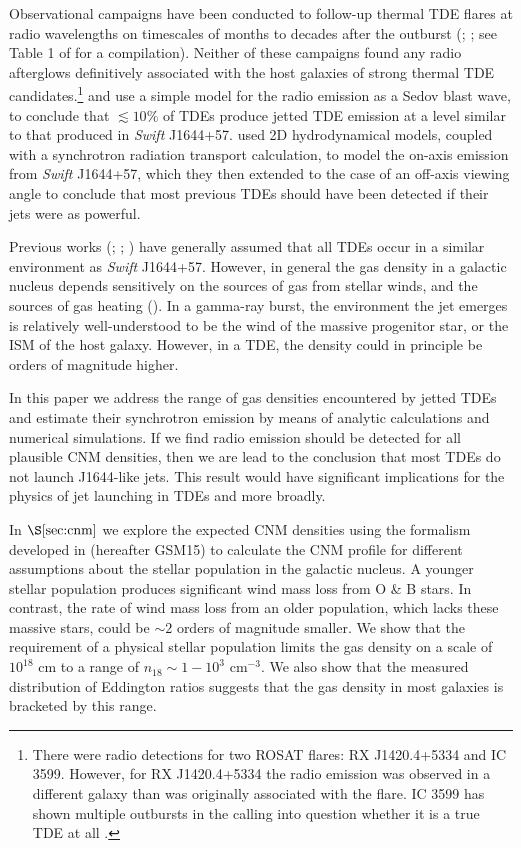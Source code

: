 \documentclass[usenatbib,fleqn]{mnras}
\begin{document}
Observational campaigns have been conducted to follow-up thermal TDE
flares at radio wavelengths on timescales of months to decades after
the outburst (\citealt{Bower+2013}; \citealt{van-Velzen+2013}; see
Table 1 of \citet{Mimica+2015} for a compilation). Neither of these
campaigns found any radio afterglows definitively associated with the
host galaxies of strong thermal TDE candidates.\footnote{There were
  radio detections for two ROSAT flares: RX J1420.4+5334 and IC
  3599. However, for RX J1420.4+5334 the radio emission was observed
  in a different galaxy than was originally associated with the flare.
  IC 3599 has shown multiple outbursts in the calling into question
  whether it is a true TDE at all \citep{Campana+2015}.}
\citet{Bower+2013} and \citet{van-Velzen+2013} use a simple model for
the radio emission as a Sedov blast wave, to conclude that $\lesssim
10\%$ of TDEs produce jetted TDE emission at a level similar to that
produced in {\it Swift} J1644+57.  \citet{Mimica+2015} used 2D
hydrodynamical models, coupled with a synchrotron radiation transport
calculation, to model the on-axis emission from {\it Swift} J1644+57,
which they then extended to the case of an off-axis viewing angle to
conclude that most previous TDEs should have been detected if their
jets were as powerful.

Previous works (\citet{Bower+2013}; \citet{van-Velzen+2013};
\citealt{Mimica+2015}) have generally assumed that all TDEs occur in a
similar environment as {\it Swift} J1644+57.  However, in general the
gas density in a galactic nucleus depends sensitively on the sources
of gas from stellar winds, and the sources of gas heating
(\citealt{Quataert2004,Generozov+2015}).  In a gamma-ray
burst, the environment the jet emerges is relatively well-understood
to be the wind of the massive progenitor star, or the ISM of the host
galaxy.  However, in a TDE, the density could in principle be orders
of magnitude higher.

In this paper we address the range of gas densities encountered by
jetted TDEs and estimate their synchrotron emission by means of
analytic calculations and numerical simulations.  If we find radio
emission should be detected for all plausible CNM densities, then we
are lead to the conclusion that most TDEs do not launch J1644-like
jets.  This result would have significant implications for the physics
of jet launching in TDEs and more broadly.

In $\S\ref{sec:cnm}$ we explore the expected CNM densities using the
formalism developed in \citet{Generozov+2015} (hereafter GSM15) to
calculate the CNM profile for different assumptions about the stellar
population in the galactic nucleus.  A younger stellar population
produces significant wind mass loss from O \& B stars. In contrast,
the rate of wind mass loss from an older population, which lacks these
massive stars, could be $\sim 2$ orders of magnitude smaller.  We show
that the requirement of a physical stellar population limits the gas
density on a scale of $10^{18}$ cm to a range of $n_{18} \sim
1-10^{3}$ cm$^{-3}$. We also show that the measured distribution
of Eddington ratios suggests that the gas density in most galaxies is
bracketed by this range.
\end{document}
